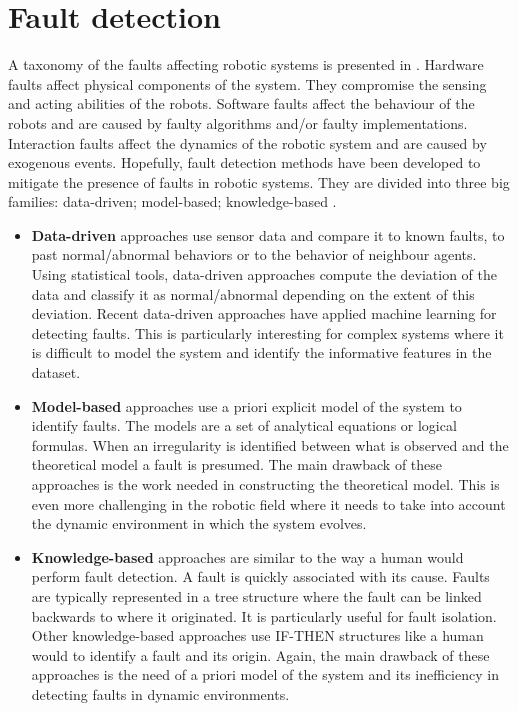 \section{Fault detection}

A taxonomy of the faults affecting robotic systems is presented in \cite{khalastchi2018fault}. Hardware faults affect physical components of the system. They compromise the sensing and acting abilities of the robots. Software faults affect the behaviour of the robots and are caused by faulty algorithms and/or faulty implementations. Interaction faults affect the dynamics of the robotic system and are caused by exogenous events. Hopefully, fault detection methods have been developed to mitigate the presence of faults in robotic systems. They are divided into three big families: data-driven; model-based; knowledge-based \cite{khalastchi2018fault}. 

\begin{itemize}
\item \textbf{Data-driven} approaches use sensor data and compare it to known faults, to past normal/abnormal behaviors or to the behavior of neighbour agents. Using statistical tools, data-driven approaches compute the deviation of the data and classify it as normal/abnormal depending on the extent of this deviation.  Recent data-driven approaches have applied machine learning for detecting faults. This is particularly interesting for complex systems where it is difficult to model the system and identify the informative features in the dataset.
\item \textbf{Model-based} approaches use a priori explicit model of the system to identify faults. The models are a set of analytical equations or logical formulas. When an irregularity is identified between what is observed and the theoretical model a fault is presumed. The main drawback of these approaches is the work needed in constructing the theoretical model. This is even more challenging in the robotic field where it needs to take into account the dynamic environment in which the system evolves. 
\item \textbf{Knowledge-based} approaches are similar to the way a human would perform fault detection. A fault is quickly associated with its cause. Faults are typically represented in a tree structure where the fault can be linked backwards to where it originated. It is particularly useful for fault isolation. Other knowledge-based approaches use IF-THEN structures like a human would to identify a fault and its origin. Again, the main drawback of these approaches is the need of a priori model of the system and its inefficiency in detecting faults in dynamic environments.
\end{itemize}


